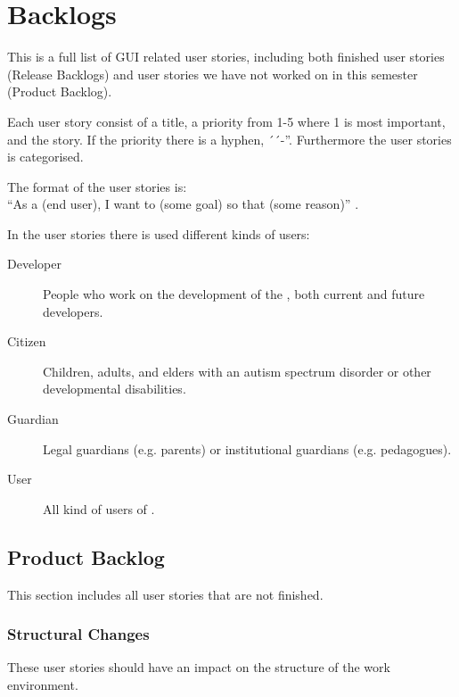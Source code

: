 \chapter{Backlogs} \label{app:product-backlog-s1}
This is a full list of GUI related user stories, including both finished user stories (Release Backlogs) and user stories we have not worked on in this semester (Product Backlog). 

Each user story consist of a title, a priority from 1-5 where 1 is most important, and the story. If the priority there is a hyphen, ´´-''.
Furthermore the user stories is categorised.

The format of the user stories is: \\
``As a (end user), I want to (some goal) so that (some reason)'' \citep{agile-topics}.

In the user stories there is used different kinds of users:
\begin{description}
\item [Developer] People who work on the development of the \giraf, both current and future developers.
\item [Citizen] Children, adults, and elders with an autism spectrum disorder or other developmental disabilities.
\item [Guardian] Legal guardians (e.g. parents) or institutional guardians (e.g. pedagogues).
\item [User] All kind of users of \giraf.
\end{description}

\section{Product Backlog}
This section includes all user stories that are not finished.
\subsection{Structural Changes}
These user stories should have an impact on the structure of the work environment.

